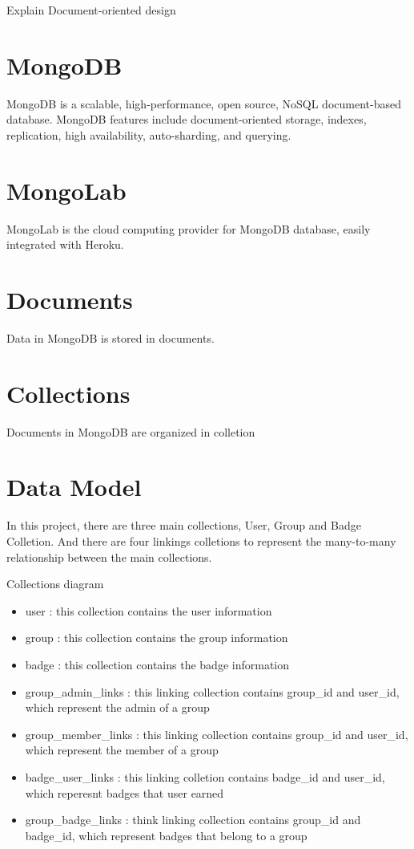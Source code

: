 
Explain Document-oriented design 

\section{MongoDB}
 MongoDB is a scalable, high-performance, open source, NoSQL document-based database. MongoDB features include document-oriented storage, indexes, replication, high availability, auto-sharding, and querying.

\section{MongoLab}
MongoLab is the cloud computing provider for MongoDB database, easily integrated with Heroku.

\section{Documents}
Data in MongoDB is stored in documents.

\section{Collections}
Documents in MongoDB are organized in colletion

\section{Data Model}
In this project, there are three main collections, User, Group and Badge Colletion. And there are four linkings colletions to represent the many-to-many relationship between the main collections.

Collections diagram

\begin{itemize}
\item user : this collection contains the user information
\item group : this collection contains the group information  
\item badge : this collection contains the badge information
\item group{\_}admin{\_}links : this linking collection contains group{\_}id and user{\_}id, which represent the admin of a group
\item group{\_}member{\_}links : this linking collection contains group{\_}id and user{\_}id, which represent the member of a group
\item badge{\_}user{\_}links : this linking colletion contains badge{\_}id and user{\_}id, which reperesnt badges that user earned
\item group{\_}badge{\_}links : think linking collection contains group{\_}id and badge{\_}id, which represent badges that belong to a group
\end{itemize}




